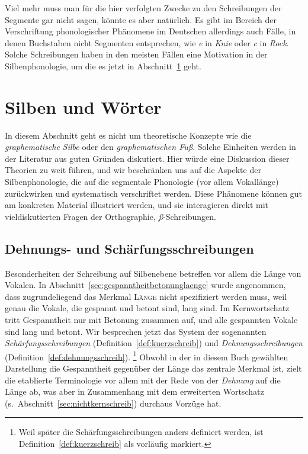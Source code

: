Viel mehr muss man für die hier verfolgten Zwecke zu den Schreibungen der Segmente gar nicht sagen, könnte es aber natürlich.
Es gibt im Bereich der Verschriftung phonologischer Phänomene im Deutschen allerdings auch Fälle, in denen Buchstaben nicht Segmenten entsprechen, wie \textit{e} in \textit{Knie} oder \textit{c} in \textit{Rock}.
Solche Schreibungen haben in den meisten Fällen eine Motivation in der Silbenphonologie, um die es jetzt in Abschnitt~\ref{sec:silbenschreib} geht.




\section{Silben und Wörter}

\label{sec:silbenschreib}

In diesem Abschnitt geht es nicht um theoretische Konzepte wie die \textit{graphematische Silbe} oder den \textit{graphematischen Fuß}.
Solche Einheiten werden in der Literatur aus guten Gründen diskutiert.
Hier würde eine Diskussion dieser Theorien zu weit führen, und wir beschränken uns auf die Aspekte der Silbenphonologie, die auf die segmentale Phonologie (vor allem Vokallänge) zurückwirken und systematisch verschriftet werden.
Diese Phänomene können gut am konkreten Material illustriert werden, und sie interagieren direkt mit vieldiskutierten Fragen der Orthographie, \zB \textit{ß}-Schreibungen.

\subsection{Dehnungs- und Schärfungsschreibungen}

\label{sec:laengeschreib}

Besonderheiten der Schreibung auf Silbenebene betreffen vor allem die Länge von Vokalen.
In Abschnitt~\ref{sec:gespanntheitbetonunglaenge} wurde angenommen, dass zugrundeliegend das Merkmal \textsc{Länge} nicht spezifiziert werden muss, weil genau die Vokale, die gespannt und betont sind, lang sind.
Im Kernwortschatz tritt Gespanntheit nur mit Betonung zusammen auf, und alle gespannten Vokale sind lang und betont.
Wir besprechen jetzt das System der sogenannten \textit{Schärfungsschreibungen} (Definition~\ref{def:kuerzschreib}) und \textit{Dehnungsschreibungen} (Definition~\ref{def:dehnungsschreib}).%
\footnote{Weil später die Schärfungsschreibungen anders definiert werden, ist Definition~\ref{def:kuerzschreib} als vorläufig markiert.}
Obwohl in der in diesem Buch gewählten Darstellung die Gespanntheit gegenüber der Länge das zentrale Merkmal ist, zielt die etablierte Terminologie vor allem mit der Rede von der \textit{Dehnung} auf die Länge ab, was aber in Zusammenhang mit dem erweiterten Wortschatz (s.\ Abschnitt~\ref{sec:nichtkernschreib}) durchaus Vorzüge hat.

